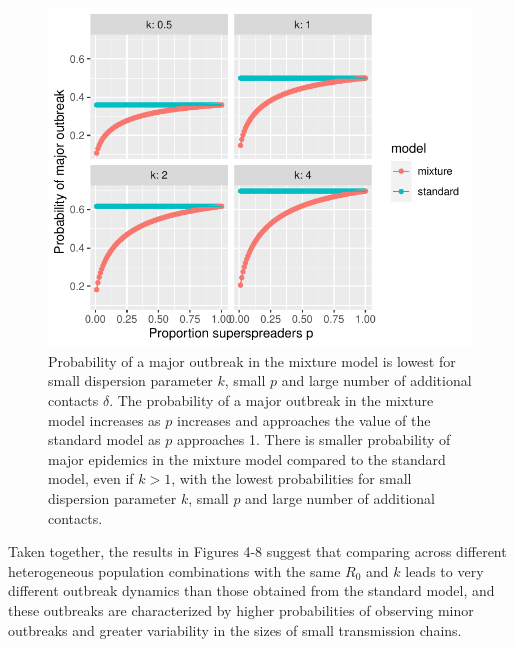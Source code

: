 \documentclass{imammb}
\numberwithin{equation}{section}
\begin{document}
  \begin{figure}
    \centering
    \includegraphics{Figure5.pdf}
    \caption{ Probability of a major outbreak in the mixture model is lowest for small dispersion parameter $k$, small $p$ and large number of additional contacts $\delta$. The probability of a major outbreak in the mixture model increases as $p$ increases and approaches the value of the standard model as $p$ approaches 1. There is smaller probability of major epidemics in the mixture model compared to the standard model, even if $k>1$, with the lowest probabilities for small dispersion parameter $k$, small $p$ and large number of additional contacts.}
    \label{fig:outbreak}
\end{figure}
  
  Taken together, the results in Figures 4-8 suggest that comparing across different heterogeneous population combinations with the same $R_0$ and $k$ leads to very different outbreak dynamics than those obtained from the standard model, and these outbreaks are characterized by higher probabilities of observing minor outbreaks and greater variability in the sizes of small transmission chains.
  
  
  
  
\end{document}
